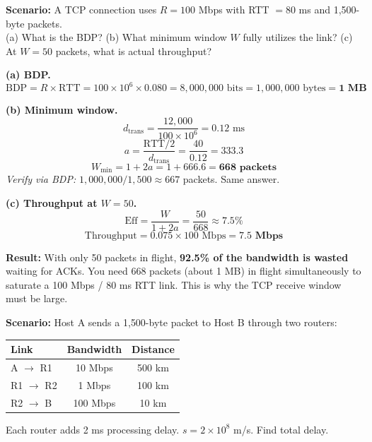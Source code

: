 \documentclass[11pt, letterpaper]{article}
\begin{document}
\vspace{8pt}

\begin{tcolorbox}[colback=part4bg, colframe=sectionorange,
  title={\bfseries Problem A3 --- Window Sizing: How Many Packets Must Be In Flight?}, arc=3pt, boxrule=1pt]
\textbf{Scenario:} A TCP connection uses $R = 100$ Mbps with RTT $= 80$ ms and
1{,}500-byte packets.\\
(a) What is the BDP?\quad
(b) What minimum window $W$ fully utilizes the link?\quad
(c) At $W = 50$ packets, what is actual throughput?
\end{tcolorbox}

\textbf{(a) BDP.}
\[\text{BDP} = R \times \text{RTT} = 100 \times 10^6 \times 0.080 = 8{,}000{,}000 \text{ bits} = 1{,}000{,}000 \text{ bytes} = \mathbf{1 \text{ MB}}\]

\textbf{(b) Minimum window.}
\[d_{\text{trans}} = \frac{12{,}000}{100 \times 10^6} = 0.12 \text{ ms}\]
\[a = \frac{\text{RTT}/2}{d_{\text{trans}}} = \frac{40}{0.12} = 333.3\]
\[W_{\min} = 1 + 2a = 1 + 666.6 = \mathbf{668 \text{ packets}}\]
\textit{Verify via BDP: } $1{,}000{,}000 / 1{,}500 \approx 667$ packets. Same answer.

\textbf{(c) Throughput at $W = 50$.}
\[\text{Eff} = \frac{W}{1+2a} = \frac{50}{668} \approx 7.5\%\]
\[\text{Throughput} = 0.075 \times 100 \text{ Mbps} = \mathbf{7.5 \text{ Mbps}}\]

\begin{tcolorbox}[colback=part4bg, colframe=sectionorange, arc=3pt, boxrule=1pt]
\textbf{Result:} With only 50 packets in flight, \textbf{92.5\% of the bandwidth is wasted}
waiting for ACKs. You need 668 packets (about 1 MB) in flight simultaneously to saturate a
100 Mbps / 80 ms RTT link. This is why the TCP receive window must be large.
\end{tcolorbox}

\vspace{8pt}

\begin{tcolorbox}[colback=part4bg, colframe=sectionorange,
  title={\bfseries Problem A4 --- Multi-Hop End-to-End Delay with a Bottleneck}, arc=3pt, boxrule=1pt]
\textbf{Scenario:} Host A sends a 1{,}500-byte packet to Host B through two routers:
\begin{center}
\renewcommand{\arraystretch}{1.2}
\begin{tabular}{lcc}
\toprule
\textbf{Link} & \textbf{Bandwidth} & \textbf{Distance} \\
\midrule
A $\to$ R1 & 10 Mbps  & 500 km \\
R1 $\to$ R2 & 1 Mbps  & 100 km \\
R2 $\to$ B  & 100 Mbps & 10 km  \\
\bottomrule
\end{tabular}
\end{center}
Each router adds 2 ms processing delay. $s = 2\times10^8$ m/s. Find total delay.
\end{tcolorbox}
\end{document}

